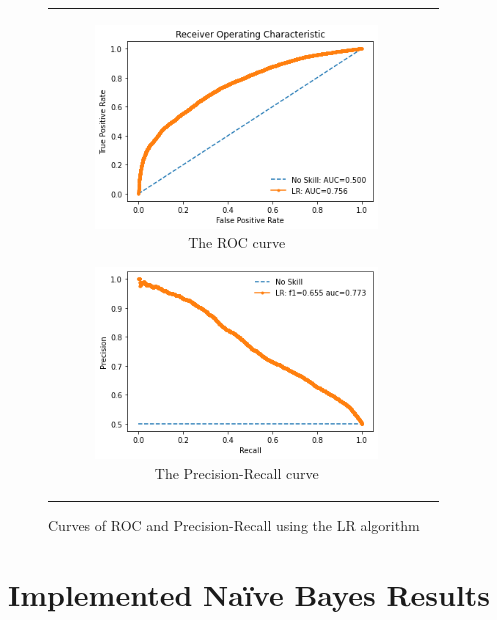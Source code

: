 \begin{figure}[H]
\begin{tabular}{@{}cc@{}}
\begin{subfigure}{0.5\textwidth}
  \centering
  \includegraphics[width=7.5cm]{fig/chapter5/LR/ROC_new.png}
  \caption{\footnotesize{The \acrshort{ROC} curve}}
  \label{fig:lrroc}
\end{subfigure} 
\begin{subfigure}{0.5\textwidth}
  \centering
  \includegraphics[width=7.5cm]{fig/chapter5/LR/Precision-Recall_new.png}
  \caption{\footnotesize{The Precision-Recall curve}}
  \label{fig:lrprerec}
\end{subfigure} \\
\end{tabular}
\caption{Curves of \acrshort{ROC} and Precision-Recall using the \acrlong{LR} algorithm}
\label{fig:lrcurves}
\end{figure}

\section{Implemented Na\"ive Bayes Results}


